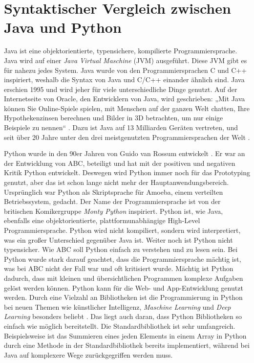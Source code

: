 
\chapter{Syntaktischer Vergleich zwischen Java und Python}
Java ist eine objektorientierte, typensichere, kompilierte Programmiersprache. 
Java wird auf einer \textit{Java Virtual Maschine} (JVM) ausgeführt. 
Diese JVM gibt es für nahezu jedes System. 
Java wurde von den Programmiersprachen C und C++ inspiriert, weshalb die Syntax von Java und C/C++ einander ähnlich sind. 
Java erschien 1995 und wird jeher für viele unterschiedliche Dinge genutzt. 
Auf der Internetseite von Oracle, den Entwicklern von Java, wird geschrieben: „Mit Java können Sie Online-Spiele spielen, mit Menschen auf der ganzen Welt chatten, Ihre Hypothekenzinsen berechnen und Bilder in 3D betrachten, um nur einige Beispiele zu nennen“ \cite{Oracle:Java}. 
Dazu ist Java auf 13 Milliarden Geräten vertreten, und seit über 20 Jahre unter den drei meistgenutzten Programmiersprachen der Welt \cite{Github:PYPL}\cite{Oracle:Twitter}.
\par
Python wurde in den 90er Jahren von Guido van Rossum entwickelt \cite{Python3:Buch}. 
Er war an der Entwicklung von ABC, beteiligt und hat mit der positiven und negativen Kritik Python entwickelt. 
Deswegen wird Python immer noch für das Prototyping genutzt, aber das ist schon lange nicht mehr der Hauptanwendungsbereich. 
Ursprünglich war Python als Skriptsprache für Amoeba, einem verteilten Betriebssystem, gedacht. 
Der Name der Programmiersprache ist von der britischen Komikergruppe \textit{Monty Python} inspiriert. 
Python ist, wie Java, ebenfalls eine objektorientierte, plattformunabhängige High-Level Programmiersprache. 
Python wird nicht kompiliert, sondern wird interpretiert, was ein großer Unterschied gegenüber Java ist. 
Weiter noch ist Python nicht typensicher. 
Wie ABC soll Python einfach zu verstehen und zu lesen sein. 
Bei Python wurde stark darauf geachtet, dass die Programmiersprache mächtig ist, was bei ABC nicht der Fall war und oft kritisiert wurde. 
Mächtig ist Python dadurch, dass mit kleinen und übersichtlichen Programmen komplexe Aufgaben gelöst werden können. 
Python kann für die Web- und App-Entwicklung genutzt werden. 
Durch eine Vielzahl an Bibliotheken ist die Programmierung in Python bei neuen Themen wie künstlicher Intelligenz, \textit{Maschine Learning} und \textit{Deep Learning} besonders beliebt \cite{PythonCS}. 
Das liegt auch daran, dass Python Bibliotheken so einfach wie möglich bereitstellt. 
Die Standardbibliothek ist sehr umfangreich. 
Beispielsweise ist das Summieren eines jeden Elements in einem Array in Python durch eine Methode in der Standardbibliothek bereits implementiert, während bei Java auf komplexere Wege zurückgegriffen werden muss.

